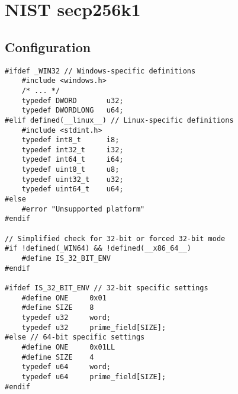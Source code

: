 \chapter{NIST secp256k1}
\iffalse
\section{Time Measure in Linux}

\begin{lstlisting}[style=C]
#define _POSIX_C_SOURCE 200809L
#include <time.h>

typedef int8_t i8;
typedef int32_t i32;
typedef int64_t i64;

typedef uint8_t u8;
typedef uint32_t u32;
typedef uint64_t u64;

inline u64 rdtsc(void) {
	u32 lo, hi;
	
	__asm__ __volatile__ (
	"rdtsc" : "=a" (lo), "=d" (hi)
	);
	
	return ((u64)hi << 32) | lo;
}

u64 measure_cycle(void (*func)(u8*, u8*), u8* para1, u8* para2) {
	u64 start, end;
	const u64 num_runs = 10000;
	
	func(para1, para2);
	start = rdtsc();
	for (i32 i = 0; i < num_runs; i++)
		func(para1, para2);
	end = rdtsc();
	
	return (end - start) / num_runs;
}

double measure_time(void (*func)(u8*, u8*), u8* para1, u8* para2) {
	struct timespec start, end;
	double cpu_time_used;
	const double num_runs = 10000;
	
	func(para1, para2);
	clock_gettime(CLOCK_MONOTONIC, &start);
	for (i32 i = 0; i < num_runs; i++)
		func(para1, para2);
	clock_gettime(CLOCK_MONOTONIC, &end);
	
	cpu_time_used =
		(end.tv_sec - start.tv_sec) +
		(end.tv_nsec - start.tv_nsec) / 1e9;
	
	return cpu_time_used / num_runs;
}
\end{lstlisting}
\fi

\section*{Configuration}
\begin{lstlisting}[style=C]
#ifdef _WIN32 // Windows-specific definitions
	#include <windows.h> 
	/* ... */
	typedef DWORD 		u32;
	typedef DWORDLONG 	u64;
#elif defined(__linux__) // Linux-specific definitions
	#include <stdint.h>
	typedef int8_t 		i8;
	typedef int32_t 	i32;
	typedef int64_t 	i64;
	typedef uint8_t 	u8;
	typedef uint32_t 	u32;
	typedef uint64_t 	u64;
#else
	#error "Unsupported platform"
#endif

// Simplified check for 32-bit or forced 32-bit mode
#if !defined(_WIN64) && !defined(__x86_64__)
	#define IS_32_BIT_ENV
#endif

#ifdef IS_32_BIT_ENV // 32-bit specific settings
	#define ONE 	0x01
	#define SIZE 	8
	typedef u32 	word;
	typedef u32 	prime_field[SIZE];
#else // 64-bit specific settings
	#define ONE 	0x01LL
	#define SIZE 	4
	typedef u64 	word;
	typedef u64 	prime_field[SIZE];
#endif
\end{lstlisting}

